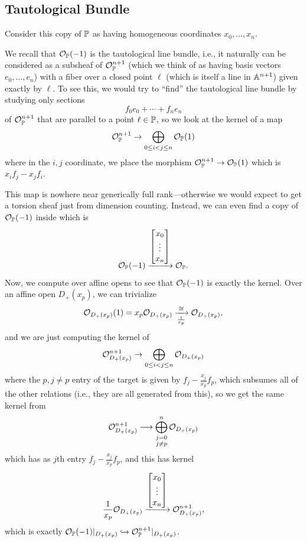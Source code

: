 \documentclass[12pt]{article}
\begin{document}
\subsection{Tautological Bundle}
Consider this copy of $\P$ as having homogeneous coordinates $x_0,\dots,x_n$.

We recall that $\cO_\P(-1)$ is the tautological line bundle, i.e., it naturally can be considered as a subsheaf of $\cO_\P^{n+1}$ (which we think of as having basis vectors $e_0,\dots,e_n$) with a fiber over a closed point $\ell$ (which is itself a line in $\A^{n+1}$) given exactly by $\ell$. To see this, we would try to ``find'' the tautological line bundle by studying only sections
\[f_0 e_0 + \cdots + f_n e_n\]
of $\cO_\P^{n+1}$ that are parallel to a point $\ell \in \P$, so we look at the kernel of a map
\[\cO_\P^{n+1} \to \bigoplus_{0\leq i<j \leq n} \cO_\P(1)\]
where in the $i,j$ coordinate, we place the morphism $\cO_\P^{n+1}\to \cO_\P(1)$ which is $x_i f_j - x_j f_i$.

This map is nowhere near generically full rank---otherwise we would expect to get a torsion sheaf just from dimension counting. Instead, we can even find a copy of $\cO_\P(-1)$ inside which is
\[\cO_\P(-1) \xrightarrow{\begin{bmatrix}
    x_0\\\vdots\\x_n
\end{bmatrix}} \cO_\P.\]
Now, we compute over affine opens to see that $\cO_\P(-1)$ is exactly the kernel. Over an affine open $D_+(x_p)$, we can trivialize
\[\cO_{D_+(x_p)}(1) = x_p\cO_{D_+(x_p)} \xrightarrow[\frac{1}{x_p}]{\cong} \cO_{D_+(x_p)},\]
and we are just computing the kernel of
\[\cO_{D_+(x_p)}^{n+1} \to \bigoplus_{0\leq i < j \leq n} \cO_{D_+(x_p)}\]
where the $p,j\neq p$ entry of the target is given by $f_j - \frac{x_j}{x_p} f_p$, which subsumes all of the other relations (i.e., they are all generated from this), so we get the same kernel from
\[\cO_{D_+(x_p)}^{n+1} \longrightarrow \bigoplus_{\substack{j=0\\j\neq p}}^n \cO_{D_+(x_p)}\]
which has as $j$th entry $f_j - \frac{x_j}{x_p} f_p$, and this has kernel
\[\frac{1}{x_p} \cO_{D_+(x_p)} \xrightarrow{\begin{bmatrix}
    x_0\\\vdots\\x_n
\end{bmatrix}} \cO_{D_+(x_p)}^{n+1},\]
which is exactly $\cO_\P(-1)|_{D_+(x_p)} \hookrightarrow \cO_\P^{n+1}|_{D_+(x_p)}$.
\end{document}
